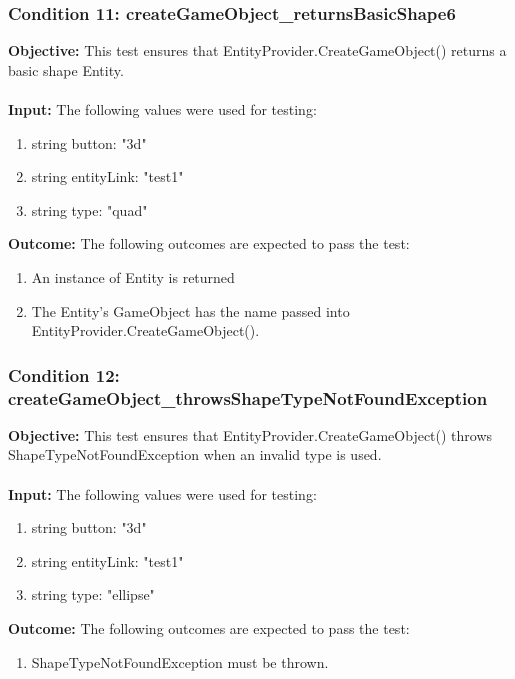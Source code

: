 \documentclass[a4paper,12pt]{article}
\begin{document}
		\subsubsection{Condition 11: createGameObject\_returnsBasicShape6}
			\textbf{Objective:} This test ensures that EntityProvider.CreateGameObject() returns a basic shape Entity.\\\\
			\textbf{Input:} The following values were used for testing:
				\begin{enumerate}
					\item string button: "3d"
					\item string entityLink: "test1"
					\item string type: "quad"
				\end{enumerate}
			\textbf{Outcome:} The following outcomes are expected to pass the test:
				\begin{enumerate}
					\item An instance of Entity is returned
					\item The Entity's GameObject has the name passed into EntityProvider.CreateGameObject().
				\end{enumerate}
		\subsubsection{Condition 12: createGameObject\_throwsShapeTypeNotFoundException}
			\textbf{Objective:} This test ensures that EntityProvider.CreateGameObject() throws ShapeTypeNotFoundException when an invalid type is used.\\\\
			\textbf{Input:} The following values were used for testing:
				\begin{enumerate}
					\item string button: "3d"
					\item string entityLink: "test1"
					\item string type: "ellipse"
				\end{enumerate}
			\textbf{Outcome:} The following outcomes are expected to pass the test:
				\begin{enumerate}
					\item ShapeTypeNotFoundException must be thrown.
				\end{enumerate}
\end{document}
